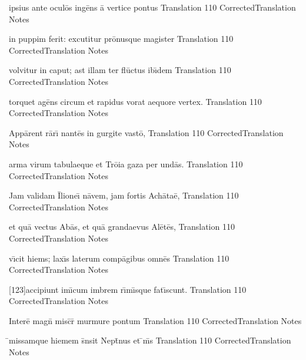 \documentclass[]{book}
\begin{document}
	\latline
	  {ipsius ante ocul\={\macron o}s ing\={\macron e}ns \={\macron a} vertice pontus}
	  { Translation }
	  {110}
	  { CorrectedTranslation }
	  { Notes }


	\latline
	  {in puppim ferit:  excutitur pr\={\macron o}nusque magister}
	  { Translation }
	  {110}
	  { CorrectedTranslation }
	  { Notes }


	\newpage

	\latline
	  {volvitur in caput; ast illam ter fl\={\macron u}ctus ib\={\macron \i}dem}
	  { Translation }
	  {110}
	  { CorrectedTranslation }
	  { Notes }


	\latline
	  {torquet ag\={\macron e}ns circum et rapidus vorat aequore vertex.}
	  { Translation }
	  {110}
	  { CorrectedTranslation }
	  { Notes }


	\latline
	  {App\={\macron a}rent r\={\macron a}r\={\macron \i} nant\={\macron e}s in gurgite vast\={\macron o},}
	  { Translation }
	  {110}
	  { CorrectedTranslation }
	  { Notes }


	\newpage

	\latline
	  {arma virum tabulaeque et Tr\={\macron o}ia gaza per und\={\macron a}s.}
	  { Translation }
	  {110}
	  { CorrectedTranslation }
	  { Notes }


	\latline
	  {Jam validam \={\macron I}lione\={\macron \i} n\={\macron a}vem, jam fortis Ach\={\macron a}ta\={\macron e},}
	  { Translation }
	  {110}
	  { CorrectedTranslation }
	  { Notes }


	\latline
	  {et qu\={\macron a} vectus Ab\={\macron a}s, et qu\={\macron a} grandaevus Al\={\macron e}t\={\macron e}s,}
	  { Translation }
	  {110}
	  { CorrectedTranslation }
	  { Notes }


	\newpage

	\latline
	  {v\={\macron \i}cit hiems; lax\={\macron \i}s laterum comp\={\macron a}gibus omn\={\macron e}s}
	  { Translation }
	  {110}
	  { CorrectedTranslation }
	  { Notes }


	\latline
	  {[123]accipiunt im\={\macron \i}cum imbrem r\={\macron \i}m\={\macron \i}sque fat\={\macron \i}scunt.}
	  { Translation }
	  {110}
	  { CorrectedTranslation }
	  { Notes }

%

\latline
  {Intere\={} magn\={} misc\={}r\={\macron {\i}} murmure pontum}
  { Translation }
  {110}
  { CorrectedTranslation }
  { Notes }


\latline
  {\={}missamque hiemem s\={}nsit Nept\={}nus et \={\macron {\i}}m\={\macron {\i}}s}
  { Translation }
  {110}
  { CorrectedTranslation }
  { Notes }
\end{document}
